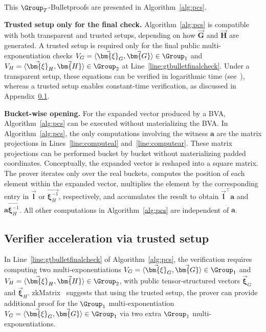 This $\Group_T$-Bulletproofs are presented in Algorithm~\ref{alg:pcs}.

\mysmallskip
\noindent
{\bf Trusted setup only for the final check.}
Algorithm~\ref{alg:pcs} is compatible with both transparent and trusted setups, depending on how
$\vec{\bm{G}}$ and $\vec{\bm{H}}$ are generated.
A trusted setup is required only for the final public multi-exponentiation checks
$V_G = \langle \vec{\bm{\xi}}_G , \vec{\bm{G}} \rangle \in \Group_1$ and
$V_H = \langle \vec{\bm{\xi}}_H , \vec{\bm{H}} \rangle \in \Group_2$
at Line~\ref{line:gtbulletfinalcheck}.
Under a transparent setup, these equations can be verified in logarithmic time
(see~\cite[\S 4.5]{iacr/cong25}),
whereas a trusted setup enables constant-time verification, as discussed in
Appendix~\ref{appx:g2acc}.

\mysmallskip
\noindent
{\bf Bucket-wise opening.}
For the expanded vector produced by a BVA, 
Algorithm~\ref{alg:pcs} can be executed without materializing the BVA.
In Algorithm~\ref{alg:pcs}, the only computations involving the witness $\bm{a}$
are the matrix projections in Lines~\ref{line:computeal} and~\ref{line:computear}.
These matrix projections can be performed bucket by bucket
without materializing padded coordinates.
Conceptually, the expanded vector is reshaped into a square matrix.
The prover iterates only over the real buckets, computes the position of each element within the expanded vector, multiplies the element by the corresponding entry in $\vec{\bm{l}}$ or $\vec{\bm{\xi}_H^{-1}}$, respectively, and accumulates the result to obtain $\vec{\bm{l}}^\top \bm{a}$ and $\bm{a}\vec{\bm{\xi}_H^{-1}}$.
All other computations in Algorithm~\ref{alg:pcs} are independent of $\bm{a}$.


\subsection{Verifier acceleration via trusted setup}
\label{appx:g2acc}
In Line~\ref{line:gtbulletfinalcheck} of Algorithm~\ref{alg:pcs}, the verification requires computing two multi-exponentiations
$V_G = \langle \vec{\bm{\xi}}_G , \vec{\bm{G}} \rangle \in \Group_1$ and
$V_H = \langle \vec{\bm{\xi}}_H, \vec{\bm{H}} \rangle \in \Group_2$,
with public tensor-structured vectors $\vec{\bm{\xi}}_G$ and $\vec{\bm{\xi}}_H$.
zkMatrix~\cite[\S 3]{asiaccs/CongYY24} suggests that using the trusted setup,
the prover can provide additional proof for the $\Group_1$ multi-exponentiation $V_G = \langle \vec{\bm{\xi}}_G, \vec{\bm{G}} \rangle \in \Group_1$ via two extra $\Group_1$ multi-exponentiations.



